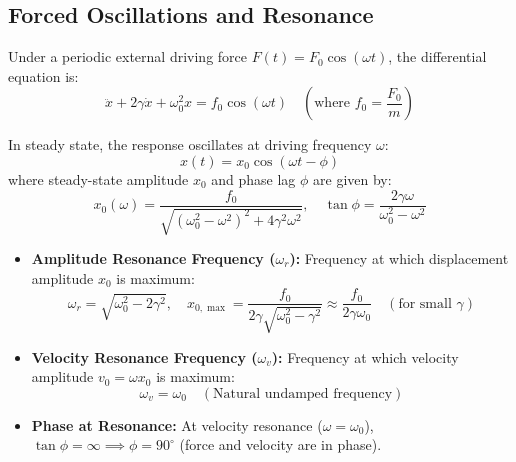 \documentclass[12pt,a4paper]{article}
\begin{document}
\subsection{Forced Oscillations and Resonance}

Under a periodic external driving force $F(t) = F_0 \cos(\omega t)$, the differential equation is:
\begin{equation}
\ddot{x} + 2\gamma \dot{x} + \omega_0^2 x = f_0 \cos(\omega t) \quad \left(\text{where } f_0 = \frac{F_0}{m}\right)
\end{equation}

In steady state, the response oscillates at driving frequency $\omega$:
\begin{equation}
x(t) = x_0 \cos(\omega t - \phi)
\end{equation}
where steady-state amplitude $x_0$ and phase lag $\phi$ are given by:
\begin{equation}
x_0(\omega) = \frac{f_0}{\sqrt{(\omega_0^2 - \omega^2)^2 + 4\gamma^2 \omega^2}}, \quad \tan \phi = \frac{2\gamma \omega}{\omega_0^2 - \omega^2}
\end{equation}

\begin{tcolorbox}[formulabox, title={\textbf{Resonance Conditions}}]
\begin{itemize}[leftmargin=*, itemsep=3pt]
  \item \textbf{Amplitude Resonance Frequency ($\omega_r$):} Frequency at which displacement amplitude $x_0$ is maximum:
  \begin{equation}
  \omega_r = \sqrt{\omega_0^2 - 2\gamma^2}, \quad x_{0,\max} = \frac{f_0}{2\gamma \sqrt{\omega_0^2 - \gamma^2}} \approx \frac{f_0}{2\gamma \omega_0} \quad (\text{for small } \gamma)
  \end{equation}
  \item \textbf{Velocity Resonance Frequency ($\omega_v$):} Frequency at which velocity amplitude $v_0 = \omega x_0$ is maximum:
  \begin{equation}
  \omega_v = \omega_0 \quad (\text{Natural undamped frequency})
  \end{equation}
  \item \textbf{Phase at Resonance:} At velocity resonance ($\omega = \omega_0$), $\tan\phi = \infty \implies \phi = 90^\circ$ (force and velocity are in phase).
\end{itemize}
\end{tcolorbox}

\end{document}
